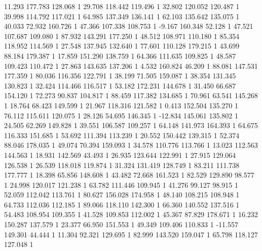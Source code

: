 	11.293 177.783 128.068 1
	29.708 118.442 119.496 1
	32.802 120.052 120.487 1
	39.998 114.792 117.021 1
	64.985 137.349 136.141 1
	62.103 135.642 135.075 1
	40.033 72.932 160.726 1
	47.366 107.338 108.753 1
	-9.167 160.348 52.128 1
	47.521 107.687 109.080 1
	87.932 143.291 177.250 1
	48.512 108.971 110.180 1
	85.354 118.952 114.569 1
	27.548 137.945 132.640 1
	77.601 110.128 179.215 1
	43.699 88.184 179.387 1
	17.859 151.290 138.759 1
	64.366 111.635 109.825 1
	48.587 109.423 110.472 1
	27.863 143.635 137.206 1
	4.532 160.824 46.209 1
	88.081 147.531 177.359 1
	80.036 116.356 122.791 1
	38.199 71.505 159.087 1
	38.354 131.345 130.823 1
	32.424 114.466 116.517 1
	53.182 172.231 144.678 1
	31.450 66.687 154.120 1
	72.273 90.837 104.817 1
	88.459 117.382 134.685 1
	70.961 63.541 145.268 1
	18.764 68.423 149.599 1
	21.967 118.316 121.582 1
	0.413 152.504 135.270 1
	76.112 115.611 120.075 1
	28.126 54.695 146.345 1
	-12.834 145.061 135.802 1
	24.505 62.269 149.828 1
	39.551 106.587 109.257 1
	64.148 141.973 164.393 1
	64.675 116.333 151.685 1
	53.692 111.394 113.239 1
	20.552 150.442 139.315 1
	52.374 88.046 178.035 1
	49.074 70.394 159.093 1
	34.578 110.776 113.766 1
	13.023 112.563 144.563 1
	18.931 142.569 43.493 1
	26.935 123.644 122.991 1
	27.915 129.064 126.538 1
	26.539 118.018 119.874 1
	31.324 131.419 128.749 1
	83.211 111.738 177.777 1
	18.398 65.856 148.608 1
	43.482 72.668 161.523 1
	82.529 129.890 98.577 1
	24.998 120.017 121.238 1
	63.782 111.446 109.945 1
	41.276 99.127 98.915 1
	52.059 112.042 113.761 1
	80.627 156.028 174.958 1
	48.140 108.215 108.948 1
	64.733 112.036 112.185 1
	89.066 118.110 142.300 1
	66.360 140.552 137.516 1
	54.483 108.954 109.355 1
	41.528 109.853 112.002 1
	45.367 87.829 178.671 1
	16.232 150.287 137.579 1
	23.377 66.950 151.553 1
	49.349 109.406 110.833 1
	-11.557 149.301 44.444 1
	11.304 92.321 129.695 1
	82.999 143.520 159.047 1
	65.798 118.127 127.048 1
